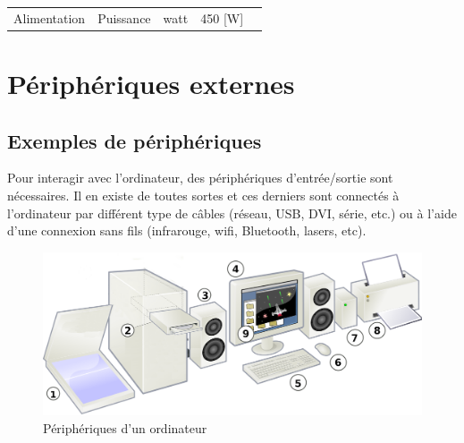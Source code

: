 \documentclass[11pt, a4paper]{book}
\begin{document}
\begin{table}[ht!]
\begin{tabular}{|l|l|l|l|l}
{ Alimentation}        & { Puissance}                                                                                                   & { watt}                                                     & { 450 {[}W{]}}                                                                          &  \\ \cline{1-4}
\end{tabular}
\end{table}


\section{Périphériques externes}

\subsection{Exemples de périphériques}

Pour interagir avec l’ordinateur, des périphériques d’entrée/sortie sont nécessaires. Il en existe de toutes sortes et ces derniers sont connectés à l’ordinateur par différent type de câbles (réseau, USB, DVI, série, etc.) ou à l’aide d’une connexion sans fils (infrarouge, wifi, Bluetooth, lasers, etc).

\begin{figure}[h]
	\centering
	\includegraphics[scale=.3]{images/peripherique}
	\caption{Périphériques d'un ordinateur}
\end{figure}
\end{document}
